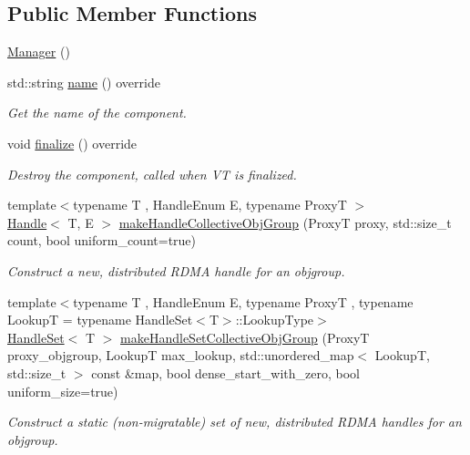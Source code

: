 \subsection*{Public Member Functions}
\begin{DoxyCompactItemize}
\item 
\hyperlink{structvt_1_1rdma_1_1_manager_aa5d34a3c5fa988278255562eea5f8aca}{Manager} ()
\item 
std\+::string \hyperlink{structvt_1_1rdma_1_1_manager_aa649646fe571ac8100a39737ac413a8d}{name} () override
\begin{DoxyCompactList}\small\item\em Get the name of the component. \end{DoxyCompactList}\item 
void \hyperlink{structvt_1_1rdma_1_1_manager_ad4ff20cf1ba6e870326b20900e6eb581}{finalize} () override
\begin{DoxyCompactList}\small\item\em Destroy the component, called when VT is finalized. \end{DoxyCompactList}\item 
{\footnotesize template$<$typename T , Handle\+Enum E, typename ProxyT $>$ }\\\hyperlink{structvt_1_1rdma_1_1_handle}{Handle}$<$ T, E $>$ \hyperlink{structvt_1_1rdma_1_1_manager_a1aea03b0c098e22cedc08159a64dbd7c}{make\+Handle\+Collective\+Obj\+Group} (ProxyT proxy, std\+::size\+\_\+t count, bool uniform\+\_\+count=true)
\begin{DoxyCompactList}\small\item\em Construct a new, distributed R\+D\+MA handle for an objgroup. \end{DoxyCompactList}\item 
{\footnotesize template$<$typename T , Handle\+Enum E, typename ProxyT , typename LookupT  = typename Handle\+Set$<$\+T$>$\+::\+Lookup\+Type$>$ }\\\hyperlink{structvt_1_1rdma_1_1_handle_set}{Handle\+Set}$<$ T $>$ \hyperlink{structvt_1_1rdma_1_1_manager_afd1aa95ce62f8bb8e7d8a4fbe96ff73a}{make\+Handle\+Set\+Collective\+Obj\+Group} (ProxyT proxy\+\_\+objgroup, LookupT max\+\_\+lookup, std\+::unordered\+\_\+map$<$ LookupT, std\+::size\+\_\+t $>$ const \&map, bool dense\+\_\+start\+\_\+with\+\_\+zero, bool uniform\+\_\+size=true)
\begin{DoxyCompactList}\small\item\em Construct a static (non-\/migratable) set of new, distributed R\+D\+MA handles for an objgroup. \end{DoxyCompactList}\item 

\end{DoxyCompactItemize}
